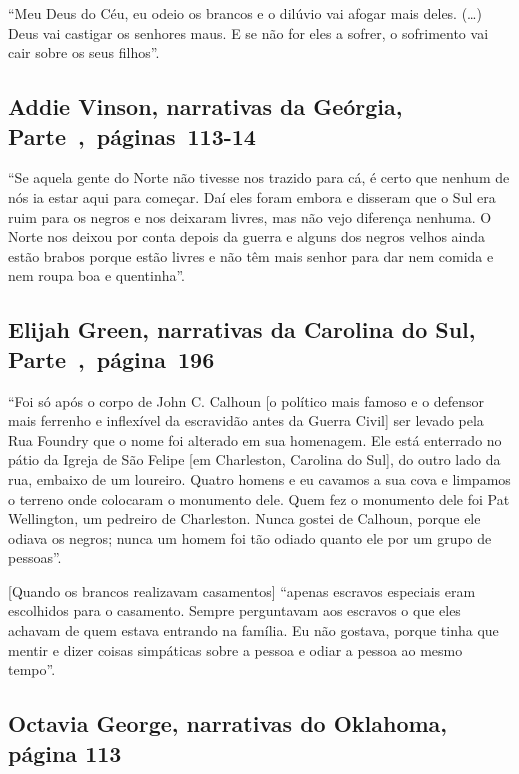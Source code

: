 ``Meu Deus do Céu, eu odeio os brancos e o dilúvio vai afogar mais
deles. (\ldots{}) Deus vai castigar os senhores maus. E se não for eles
a sofrer, o sofrimento vai cair sobre os seus filhos''.

\subsection{Addie Vinson, narrativas da Geórgia, Parte~,~páginas~113-14}
\label{ref270}

``Se aquela gente do Norte não tivesse nos trazido para cá, é certo que
nenhum de nós ia estar aqui para começar. Daí eles foram embora e
disseram que o Sul era ruim para os negros e nos deixaram livres, mas
não vejo diferença nenhuma. O Norte nos deixou por conta depois da
guerra e alguns dos negros velhos ainda estão brabos porque estão livres
e não têm mais senhor para dar nem comida e nem roupa boa e quentinha''.

\subsection{Elijah Green, narrativas da Carolina do Sul, Parte~,~página~196}
\label{ref111}


``Foi só após o corpo de John C. Calhoun {[}o político mais famoso e o
defensor mais ferrenho e inflexível da escravidão antes da Guerra
Civil{]} ser levado pela Rua Foundry que o nome foi alterado em sua
homenagem. Ele está enterrado no pátio da Igreja de São Felipe {[}em
Charleston, Carolina do Sul{]}, do outro lado da rua, embaixo de um
loureiro. Quatro homens e eu cavamos a sua cova e limpamos o terreno
onde colocaram o monumento dele. Quem fez o monumento dele foi Pat
Wellington, um pedreiro de Charleston. Nunca gostei de Calhoun, porque
ele odiava os negros; nunca um homem foi tão odiado quanto ele por um
grupo de pessoas''.

{[}Quando os brancos realizavam casamentos{]} ``apenas escravos
especiais eram escolhidos para o casamento. Sempre perguntavam aos
escravos o que eles achavam de quem estava entrando na família. Eu não
gostava, porque tinha que mentir e dizer coisas simpáticas sobre a
pessoa e odiar a pessoa ao mesmo tempo''.

\subsection{Octavia George, narrativas do Oklahoma, página 113} \label{ref105}

